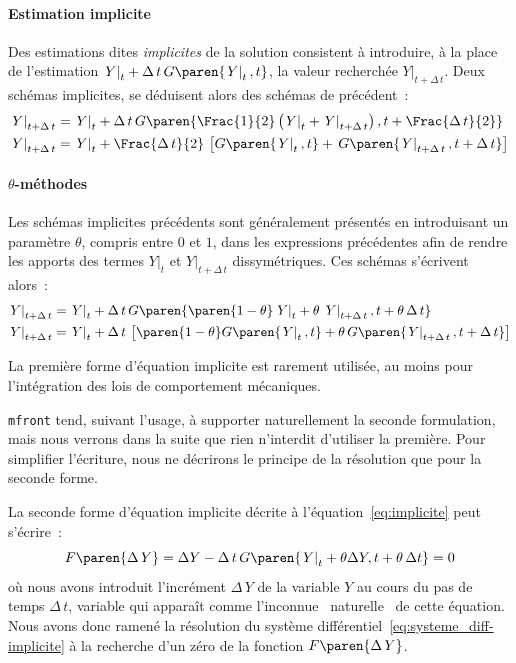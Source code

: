 \documentclass[rectoverso,pleiades,pstricks,leqno,anti]{texmf/note_technique_2010}
\newcommand{\mfront}{\texttt{mfront}}
\newcommand{\debutpas}[1]{\ensuremath{\left.#1\right|_{t}}}
\newcommand{\finpas}[1]{\ensuremath{\left.#1\right|_{t+\Delta\, t}}}
\begin{document}
\paragraph{Estimation implicite}
Des estimations dites {\em implicites} de la solution consistent à
introduire, à la place de l'estimation \(\debutpas{Y}+\Delta\, t\,
G\paren{\debutpas{Y},t}\), la valeur recherchée \(\finpas{Y}\).  Deux
schémas implicites, se déduisent alors des schémas de
 précédent~:
\[
\begin{aligned}
  \finpas{Y}&=\debutpas{Y}+\Delta\,t\,G\paren{\Frac{1}{2}\left(\debutpas{Y}+\finpas{Y}\right),t+\Frac{\Delta\, t}{2}} \\
  \finpas{Y}&=\debutpas{Y}+\Frac{\Delta\,t}{2}\,\left[G\paren{\debutpas{Y},t}
    +\,G\paren{\finpas{Y},t+\Delta\,t}\right] \\
\end{aligned}
\]

\paragraph{\(\theta\)-méthodes}

Les schémas implicites précédents sont généralement présentés en
introduisant un paramètre \(\theta\), compris entre \(0\) et \(1\),
dans les expressions précédentes afin de rendre les apports des termes
\(\debutpas{Y}\) et \(\finpas{Y}\) dissymétriques. Ces schémas
s'écrivent alors~:
\begin{equation}
  \label{eq:implicite}
  \begin{aligned}
    \finpas{Y}&=\debutpas{Y}+\Delta\,t\,G\paren{\paren{1-\theta}\debutpas{Y}+\theta\,\finpas{Y},t+\theta\,\Delta\, t} \\
    \finpas{Y}&=\debutpas{Y}+\Delta\,t\,\left[\paren{1-\theta}G\paren{\debutpas{Y},t}
      +\theta\,G\paren{\finpas{Y},t+\Delta\,t}\right]
  \end{aligned}
\end{equation}

La première forme d'équation implicite est rarement utilisée, au moins
pour l'intégration des lois de comportement mécaniques.

\mfront{} tend, suivant l'usage, à supporter naturellement la seconde
formulation, mais nous verrons dans la suite que rien n'interdit
d'utiliser la première. Pour simplifier l'écriture, nous ne décrirons
le principe de la résolution que pour la seconde forme.

La seconde forme d'équation implicite décrite à
l'équation~\eqref{eq:implicite} peut s'écrire~:
\begin{equation}
  \label{eq:F_implicite} F\paren{\Delta\, Y} = \Delta Y -
  \Delta\,t\,G\paren{\debutpas{Y}+\theta\Delta{Y},t+\theta\,\Delta t} =
  0
\end{equation}
où nous avons introduit l'incrément \(\Delta\,Y\) de la variable \(Y\)
au cours du pas de temps \(\Delta\,t\), variable qui apparaît comme
l'inconnue \og~naturelle~\fg{} de cette équation. Nous avons donc ramené
la résolution du système différentiel~\eqref{eq:systeme_diff-implicite}
à la recherche d'un zéro de la fonction \(F\paren{\Delta\, Y}\).
\end{document}
